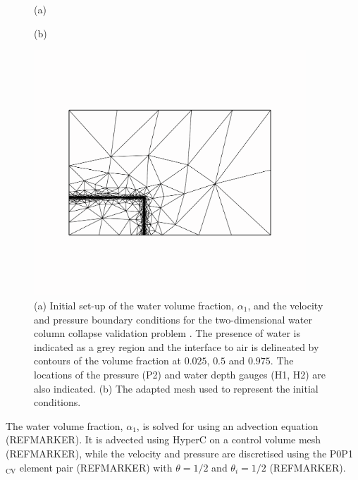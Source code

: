 \begin{figure}[tbp]
\hspace{1cm}(a)
\begin{center}

\end{center}
\hspace{1cm}(b)
\begin{center}
\includegraphics[width=10.2cm, trim=2.5cm 4.5cm 2.5cm 4.5cm, clip=true]{examples_images/water_collapse/water_collapse_0_mesh.pdf}
\end{center}
\caption{(a) Initial set-up of the water volume fraction, $\alpha_1$, and the velocity and pressure boundary conditions for the two-dimensional water column collapse validation problem \citep{zhou_nonlinear_1999}. The presence of water is indicated as a grey region and the interface to air is delineated by contours of the volume fraction at $0.025$, $0.5$ and $0.975$.  The locations of the pressure (P2) and water depth gauges (H1, H2) are also indicated. (b) The adapted mesh used to represent the initial conditions.}
\label{fig:zhouinitial}
\end{figure}

The water volume fraction, $\alpha_1$, is solved for using an advection equation (REFMARKER).  It is advected using HyperC on a control volume mesh (REFMARKER), while the velocity and pressure are discretised using the P0P1$_{\text{CV}}$ element pair (REFMARKER) with $\theta=1/2$ and $\theta_i=1/2$ (REFMARKER).  

